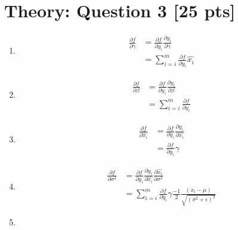 \documentclass{article}
\begin{document}
\section{Theory: Question 3 [25 pts]}

\begin{enumerate}[label=\alph*.]
    \item
    \begin{equation*}
        \begin{aligned}
            \frac{\partial f}{\partial \gamma} &= \frac{\partial f}{\partial y_i} \frac{\partial y_i}{\partial \gamma} \\
            &= \sum_{i=i}^{m}\frac{\partial f}{\partial y_i} \widehat{x_i}
        \end{aligned}
    \end{equation*}
    \item        
    \begin{equation*}
        \begin{aligned}
            \frac{\partial f}{\partial \beta} &= \frac{\partial f}{\partial y_i} \frac{\partial y_i}{\partial \beta} \\
            &= \sum_{i=i}^{m}\frac{\partial f}{\partial y_i}
        \end{aligned}
    \end{equation*}  
    \item        
    \begin{equation*}
        \begin{aligned}
            \frac{\partial f}{\partial \widehat{x_i}} &= \frac{\partial f}{\partial y_i} \frac{\partial y_i}{\partial \widehat{x_i}} \\
            &= \frac{\partial f}{\partial y_i} \gamma
        \end{aligned}
    \end{equation*}  
    \item 
    \begin{equation*}
        \begin{aligned}
            \frac{\partial f}{\partial \sigma^2} &= \frac{\partial f}{\partial y_i} \frac{\partial y_i}{\partial \widehat{x_i}} \frac{\partial \widehat{x_i}}{\partial \sigma^2} \\
            &=  \sum_{i=i}^{m}\frac{\partial f}{\partial y_i} \gamma \frac{-1}{2} \frac{(x_i-\mu)}{\sqrt{(\sigma^2 + \epsilon)^3}}
        \end{aligned}
    \end{equation*}  
    \item 

\end{enumerate}
\end{document}
